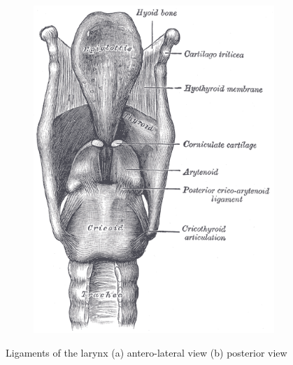 \documentclass[12pt, letter]{report}
\begin{document}
\begin{figure}
\begin{subfigure}[b]{0.4\linewidth}
\includegraphics[width=\linewidth]{larynx_ligaments_posterior_view.png}
\caption{}
\end{subfigure}
\caption{Ligaments of the larynx (a) antero-lateral view (b) posterior view \cite{Gray2000Anatomy}}
\label{fig:laryngeal_cartilage}
\end{figure}
\end{document}
